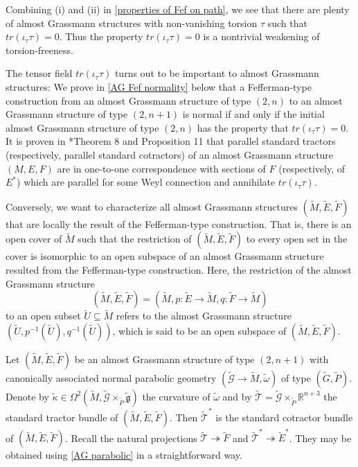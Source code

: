 \documentclass[11pt]{amsart}
\begin{document}
Combining (i) and (ii) in \cref{properties of Fef on path}, we see that there are plenty of almost Grassmann structures with non-vanishing torsion $\tau$ such that $tr(\iota_\tau\tau)=0$. Thus the property $tr(\iota_\tau\tau)=0$ is a nontrivial weakening of torsion-freeness.

The tensor field $tr(\iota_\tau\tau)$ turns out to be important to almost Grassmann structures: We prove in \cref{AG Fef normality} below that a Fefferman-type construction from an almost Grassmann structure of type $(2,n)$ to an almost Grassmann structure of type $(2,n+1)$ is normal if and only if the initial almost Grassmann structure of type $(2,n)$ has the property that $tr(\iota_\tau\tau)=0$. It is proven in \cite{Guo}*{Theorem 8 and Proposition 11} that parallel standard tractors (respectively, parallel standard cotractors) of an almost Grassmann structure $(M,E,F)$ are in one-to-one correspondence with sections of $F$ (respectively, of $E^*$) which are parallel for some Weyl connection and annihilate $tr(\iota_\tau\tau)$.

Conversely, we want to characterize all almost Grassmann structures $(\tilde M,\tilde E,\tilde F)$ that are locally the result of the Fefferman-type construction. That is, there is an open cover of $\tilde M$ such that the restriction of $(\tilde M,\tilde E,\tilde F)$ to every open set in the cover is isomorphic to an open subspace of an almost Grassmann structure resulted from the Fefferman-type construction. Here, the restriction of the almost Grassmann structure
\[(\tilde M,\tilde E,\tilde F)=(\tilde M,p:\tilde E\to\tilde M,q:\tilde F\to\tilde M)\]
to an open subset $\tilde U\subseteq\tilde M$ refers to the almost Grassmann structure $(\tilde U,p^{-1}(\tilde U),q^{-1}(\tilde U))$, which is said to be an open subspace of $(\tilde M,\tilde E,\tilde F)$.

Let $(\tilde M,\tilde E,\tilde F)$ be an almost Grassmann structure of type $(2,n+1)$ with canonically associated normal parabolic geometry $(\tilde{\mathcal G}\to\tilde M,\tilde\omega)$ of type $(\tilde G,\tilde P)$. Denote by $\tilde \kappa\in\Omega^2(\tilde M,\tilde{\mathcal G}\times_{\tilde P}\tilde{\mathfrak g})$ the curvature of $\tilde\omega$ and by $\tilde{\mathcal T}=\tilde{\mathcal G}\times_{\tilde P}\mathbb R^{n+3}$ the standard tractor bundle of $(\tilde M,\tilde E,\tilde F)$. Then $\tilde{\mathcal T}^*$ is the standard cotractor bundle of $(\tilde M,\tilde E,\tilde F)$. Recall the natural projections $\tilde{\mathcal T}\twoheadrightarrow\tilde F$ and $\tilde{\mathcal T}^*\twoheadrightarrow\tilde E^*$. They may be obtained using \cref{AG parabolic} in a straightforward way.
\end{document}
